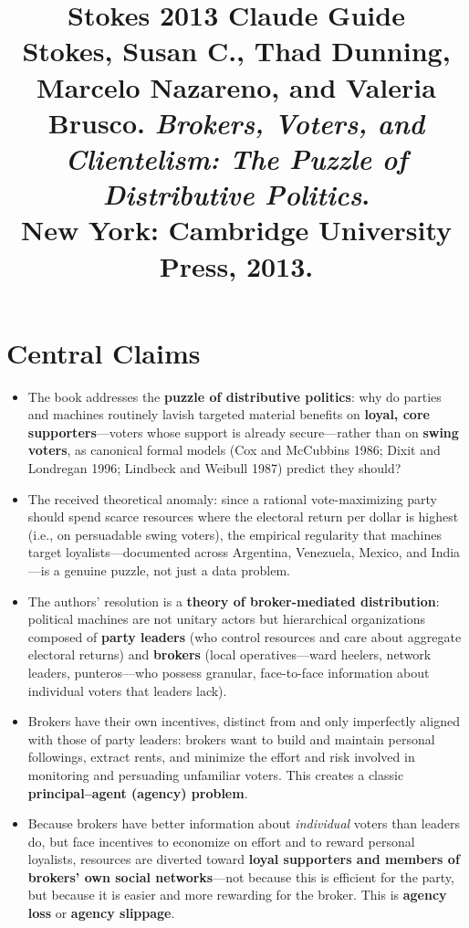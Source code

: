 \documentclass[12pt]{article}
\title{\textbf{Stokes 2013 Claude Guide}\\
\large Stokes, Susan C., Thad Dunning, Marcelo Nazareno, and Valeria Brusco. \textit{Brokers, Voters, and Clientelism: The Puzzle of Distributive Politics}.\\
New York: Cambridge University Press, 2013.}
\author{}
\date{}
\begin{document}
\maketitle
\tableofcontents
\newpage

\section{Central Claims}

\begin{itemize}[leftmargin=*, itemsep=4pt]
    \item The book addresses the \textbf{puzzle of distributive politics}: why do parties and machines routinely lavish targeted material benefits on \textbf{loyal, core supporters}---voters whose support is already secure---rather than on \textbf{swing voters}, as canonical formal models (Cox and McCubbins 1986; Dixit and Londregan 1996; Lindbeck and Weibull 1987) predict they should?
    \item The received theoretical anomaly: since a rational vote-maximizing party should spend scarce resources where the electoral return per dollar is highest (i.e., on persuadable swing voters), the empirical regularity that machines target loyalists---documented across Argentina, Venezuela, Mexico, and India---is a genuine puzzle, not just a data problem.
    \item The authors' resolution is a \textbf{theory of broker-mediated distribution}: political machines are not unitary actors but hierarchical organizations composed of \textbf{party leaders} (who control resources and care about aggregate electoral returns) and \textbf{brokers} (local operatives---ward heelers, network leaders, punteros---who possess granular, face-to-face information about individual voters that leaders lack).
    \item Brokers have their own incentives, distinct from and only imperfectly aligned with those of party leaders: brokers want to build and maintain personal followings, extract rents, and minimize the effort and risk involved in monitoring and persuading unfamiliar voters. This creates a classic \textbf{principal--agent (agency) problem}.
    \item Because brokers have better information about \emph{individual} voters than leaders do, but face incentives to economize on effort and to reward personal loyalists, resources are diverted toward \textbf{loyal supporters and members of brokers' own social networks}---not because this is efficient for the party, but because it is easier and more rewarding for the broker. This is \textbf{agency loss} or \textbf{agency slippage}.

\end{itemize}
\end{document}
